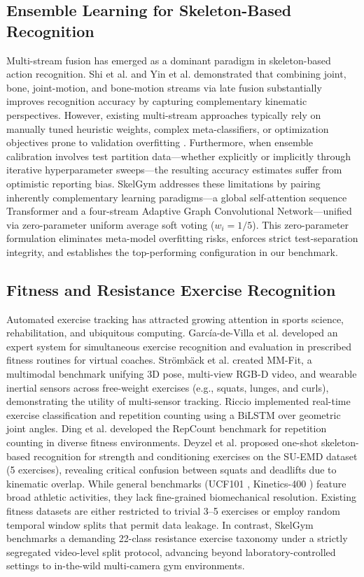 \documentclass[runningheads]{llncs}
\begin{document}
\subsection{Ensemble Learning for Skeleton-Based Recognition}
Multi-stream fusion has emerged as a dominant paradigm in skeleton-based action recognition. Shi et al. \cite{shi2020skeleton} and Yin et al. \cite{yin2023} demonstrated that combining joint, bone, joint-motion, and bone-motion streams via late fusion substantially improves recognition accuracy by capturing complementary kinematic perspectives. However, existing multi-stream approaches typically rely on manually tuned heuristic weights, complex meta-classifiers, or optimization objectives prone to validation overfitting \cite{wolpert1992stacking}. Furthermore, when ensemble calibration involves test partition data---whether explicitly or implicitly through iterative hyperparameter sweeps---the resulting accuracy estimates suffer from optimistic reporting bias. SkelGym addresses these limitations by pairing inherently complementary learning paradigms---a global self-attention sequence Transformer and a four-stream Adaptive Graph Convolutional Network---unified via zero-parameter uniform average soft voting ($w_i = 1/5$). This zero-parameter formulation eliminates meta-model overfitting risks, enforces strict test-separation integrity, and establishes the top-performing configuration in our benchmark.

\subsection{Fitness and Resistance Exercise Recognition}
Automated exercise tracking has attracted growing attention in sports science, rehabilitation, and ubiquitous computing. Garc\'{i}a-de-Villa et al. \cite{garciadevilla2022} developed an expert system for simultaneous exercise recognition and evaluation in prescribed fitness routines for virtual coaches. Str\"{o}mb\"{a}ck et al. \cite{stromback2020} created MM-Fit, a multimodal benchmark unifying 3D pose, multi-view RGB-D video, and wearable inertial sensors across free-weight exercises (e.g., squats, lunges, and curls), demonstrating the utility of multi-sensor tracking. Riccio \cite{riccio2024} implemented real-time exercise classification and repetition counting using a BiLSTM over geometric joint angles. Ding et al. \cite{ding2022repcount} developed the RepCount benchmark for repetition counting in diverse fitness environments. Deyzel et al. \cite{deyzel2023} proposed one-shot skeleton-based recognition for strength and conditioning exercises on the SU-EMD dataset (5 exercises), revealing critical confusion between squats and deadlifts due to kinematic overlap. While general benchmarks (UCF101 \cite{soomro2012ucf101}, Kinetics-400 \cite{kay2017kinetics}) feature broad athletic activities, they lack fine-grained biomechanical resolution. Existing fitness datasets are either restricted to trivial 3--5 exercises or employ random temporal window splits that permit data leakage. In contrast, SkelGym benchmarks a demanding 22-class resistance exercise taxonomy under a strictly segregated video-level split protocol, advancing beyond laboratory-controlled settings to in-the-wild multi-camera gym environments.
\end{document}
